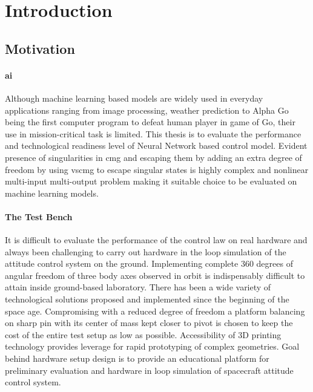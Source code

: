 \chapter{Introduction}
\label{chap:1}
\section{Motivation}


\subsubsection*{\acrfull{ai}}

Although machine learning based models are widely used in everyday applications ranging from image processing, weather prediction to Alpha Go being the first computer program to defeat human player in game of Go, \cite{Silver2016} their use in mission-critical task is limited.  This thesis is to evaluate the performance and technological readiness level of Neural Network based control model. Evident presence of singularities in \acrfull{cmg} and escaping them by adding an extra degree of freedom by using \acrfull{vscmg} to escape singular states is highly complex and nonlinear multi-input multi-output problem making it suitable choice to be evaluated on machine learning models. 

\subsubsection*{The Test Bench}
It is difficult to evaluate the performance of the control law on real hardware and always been challenging to carry out hardware in the loop simulation of the attitude control system on the ground. Implementing complete 360 degrees of angular freedom of three body axes observed in orbit is indispensably difficult to attain inside ground-based laboratory. There has been a wide variety of technological solutions proposed and implemented since the beginning of the space age. Compromising with a reduced degree of freedom a platform balancing on sharp pin with its center of mass kept closer to pivot is chosen to keep the cost of the entire test setup as low as possible. 
Accessibility of 3D printing technology provides leverage for rapid prototyping of complex geometries. Goal behind hardware setup design is to provide an educational platform for preliminary evaluation and hardware in loop simulation of spacecraft attitude control system.

